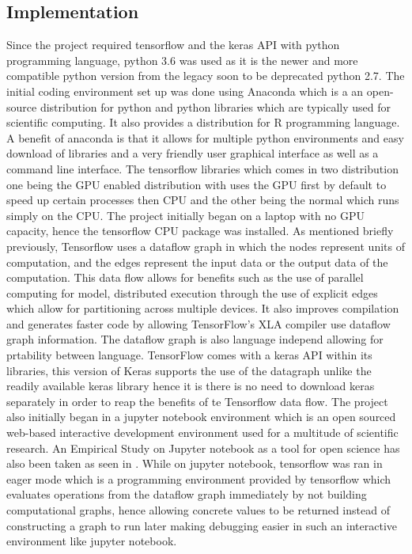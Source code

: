 \documentclass[10pt,phd,a4paper,oneside]{article}
\begin{document}
    \subsection{Implementation}
    Since the project required tensorflow and the keras API with python programming language, python 3.6 was used as it is the newer and more compatible python version from the legacy soon to be deprecated python 2.7. The initial coding environment set up was done using Anaconda which is a an open-source distribution for python and python libraries which are typically used for scientific computing. It also provides a distribution for R programming language. A benefit of anaconda is that it allows for multiple python environments and easy download of libraries and a very friendly user graphical interface as well as a command line interface.
    The tensorflow libraries which comes in two distribution one being the GPU enabled distribution with uses the GPU first by default to speed up certain processes then CPU and the other being the normal which runs simply on the CPU. The project initially began on a laptop with no GPU capacity, hence the tensorflow CPU package was installed.
    As mentioned briefly previously, Tensorflow uses a dataflow graph in which the nodes represent units of computation, and the edges represent the input data or the output data of the computation. This data flow allows for benefits such as the use of parallel computing for model, distributed execution through the use of explicit edges which allow for partitioning across multiple devices. It also improves compilation and generates faster code by allowing TensorFlow's XLA compiler use dataflow graph information. The dataflow graph is also language independ allowing for prtability between language.
    TensorFlow comes with a keras API within its libraries, this version of Keras supports the use of the datagraph unlike the readily available keras library hence it is there is no need to download keras separately in order to reap the benefits of te Tensorflow data flow.
    The project also initially began in a jupyter notebook environment which is an open sourced web-based interactive development environment used for a multitude of scientific research. An Empirical Study on Jupyter notebook as a tool for open science has also been taken as seen in \citep{Randles_2017}.  While on jupyter notebook, tensorflow was ran in eager mode which is a programming environment provided by tensorflow which evaluates operations from the dataflow graph immediately by not building computational graphs, hence allowing concrete values to be returned instead of constructing a graph to run later making debugging easier in such an interactive environment like jupyter notebook.
\end{document}
